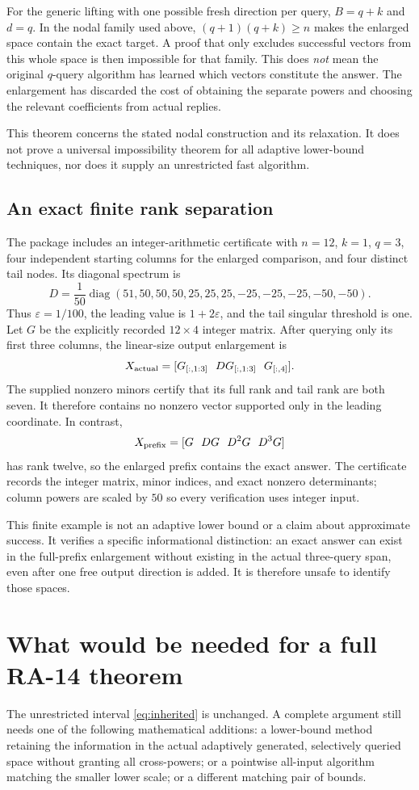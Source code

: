 \documentclass[11pt]{article}
\theoremstyle{definition}
\newcommand{\diag}{\operatorname{diag}}
\begin{document}
For the generic lifting with one possible fresh direction per query, $B=q+k$ and $d=q$. In the nodal family used above, $(q+1)(q+k)\ge n$ makes the enlarged space contain the exact target. A proof that only excludes successful vectors from this whole space is then impossible for that family. This does \emph{not} mean the original $q$-query algorithm has learned which vectors constitute the answer. The enlargement has discarded the cost of obtaining the separate powers and choosing the relevant coefficients from actual replies.

This theorem concerns the stated nodal construction and its relaxation. It does not prove a universal impossibility theorem for all adaptive lower-bound techniques, nor does it supply an unrestricted fast algorithm.

\subsection{An exact finite rank separation}
The package includes an integer-arithmetic certificate with $n=12$, $k=1$, $q=3$, four independent starting columns for the enlarged comparison, and four distinct tail nodes. Its diagonal spectrum is
\[
 D=\frac1{50}\diag(51,50,50,50,25,25,25,-25,-25,-25,-50,-50).
\]
Thus $\varepsilon=1/100$, the leading value is $1+2\varepsilon$, and the tail singular threshold is one. Let $G$ be the explicitly recorded $12\times4$ integer matrix. After querying only its first three columns, the linear-size output enlargement is
\[
 X_{\rm actual}=[G_{[:,1:3]}\ \ DG_{[:,1:3]}\ \ G_{[:,4]}].
\]
The supplied nonzero minors certify that its full rank and tail rank are both seven. It therefore contains no nonzero vector supported only in the leading coordinate. In contrast,
\[
 X_{\rm prefix}=[G\ \ DG\ \ D^2G\ \ D^3G]
\]
has rank twelve, so the enlarged prefix contains the exact answer. The certificate records the integer matrix, minor indices, and exact nonzero determinants; column powers are scaled by $50$ so every verification uses integer input.

This finite example is not an adaptive lower bound or a claim about approximate success. It verifies a specific informational distinction: an exact answer can exist in the full-prefix enlargement without existing in the actual three-query span, even after one free output direction is added. It is therefore unsafe to identify those spaces.

\section{What would be needed for a full RA-14 theorem}
The unrestricted interval \eqref{eq:inherited} is unchanged. A complete argument still needs one of the following mathematical additions: a lower-bound method retaining the information in the actual adaptively generated, selectively queried space without granting all cross-powers; or a pointwise all-input algorithm matching the smaller lower scale; or a different matching pair of bounds.
\end{document}
